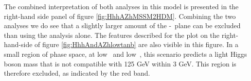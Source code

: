 The combined interpretation of both analyses in this model is presented in the right-hand side panel of
figure \ref{fig:HhhAZhMSSM2HDM}.
Combining the two analyses we do see that a slightly larger amount
of the \mA-\tanb~plane can be excluded than using the \AtoZhtolltautau analysis alone. The features
described for the plot on the right-hand-side of figure \ref{fig:HhhAndAZhlowtanb} are also visible in this figure. In a small region of phase
space, at low \mA~and low~\tanb, this scenario predicts a light Higgs boson mass that is not compatible with 125 GeV within 3 GeV.
This region is therefore excluded, as indicated by the red band. 



